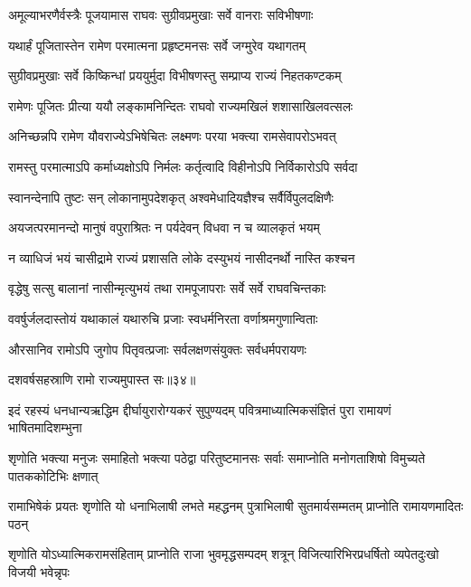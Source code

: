 \twolineshloka
{अमूल्याभरणैर्वस्त्रैः पूजयामास राघवः}
{सुग्रीवप्रमुखाः सर्वे वानराः सविभीषणाः} %

\twolineshloka
{यथार्हं पूजितास्तेन रामेण परमात्मना}
{प्रहृष्टमनसः सर्वे जग्मुरेव यथागतम्} %

\twolineshloka
{सुग्रीवप्रमुखाः सर्वे किष्किन्धां प्रययुर्मुदा}
{विभीषणस्तु सम्प्राप्य राज्यं निहतकण्टकम्} %

\twolineshloka
{रामेणः पूजितः प्रीत्या ययौ लङ्कामनिन्दितः}
{राघवो राज्यमखिलं शशासाखिलवत्सलः} %

\twolineshloka
{अनिच्छन्नपि रामेण यौवराज्येऽभिषेचितः}
{लक्ष्मणः परया भक्त्या रामसेवापरोऽभवत्} %

\twolineshloka
{रामस्तु परमात्माऽपि कर्माध्यक्षोऽपि निर्मलः}
{कर्तृत्वादि विहीनोऽपि निर्विकारोऽपि सर्वदा} %

\twolineshloka
{स्वानन्देनापि तुष्टः सन् लोकानामुपदेशकृत्}
{अश्वमेधादियज्ञैश्च सर्वैर्विपुलदक्षिणैः} %

\twolineshloka
{अयजत्परमानन्दो मानुषं वपुराश्रितः}
{न पर्यदेवन् विधवा न च व्यालकृतं भयम्} %

\twolineshloka
{न व्याधिजं भयं चासीद्रामे राज्यं प्रशासति}
{लोके दस्युभयं नासीदनर्थो नास्ति कश्चन} %

\twolineshloka
{वृद्धेषु सत्सु बालानां नासीन्मृत्युभयं तथा}
{रामपूजापराः सर्वे सर्वे राघवचिन्तकाः} %

\twolineshloka
{ववर्षुर्जलदास्तोयं यथाकालं यथारुचि}
{प्रजाः स्वधर्मनिरता वर्णाश्रमगुणान्विताः} %

\twolineshloka
{औरसानिव रामोऽपि जुगोप पितृवत्प्रजाः}
{सर्वलक्षणसंयुक्तः सर्वधर्मपरायणः} %

{दशवर्षसहस्राणि रामो राज्यमुपास्त सः॥३४॥} %


\fourlineindentedshloka
{इदं रहस्यं धनधान्यऋद्धिम\-}
{द्दीर्घायुरारोग्यकरं सुपुण्यदम्}
{पवित्रमाध्यात्मिकसंज्ञितं पुरा}
{रामायणं भाषितमादिशम्भुना} %

\fourlineindentedshloka
{शृणोति भक्त्या मनुजः समाहितो}
{भक्त्या पठेद्वा परितुष्टमानसः}
{सर्वाः समाप्नोति मनोगताशिषो}
{विमुच्यते पातककोटिभिः क्षणात्} %

\fourlineindentedshloka
{रामाभिषेकं प्रयतः शृणोति यो}
{धनाभिलाषी लभते महद्धनम्}
{पुत्राभिलाषी सुतमार्यसम्मतम्}
{प्राप्नोति रामायणमादितः पठन्} %

\fourlineindentedshloka
{शृणोति योऽध्यात्मिकरामसंहिताम्}
{प्राप्नोति राजा भुवमृद्धसम्पदम्}
{शत्रून् विजित्यारिभिरप्रधर्षितो}
{व्यपेतदुःखो विजयी भवेन्नृपः} %

